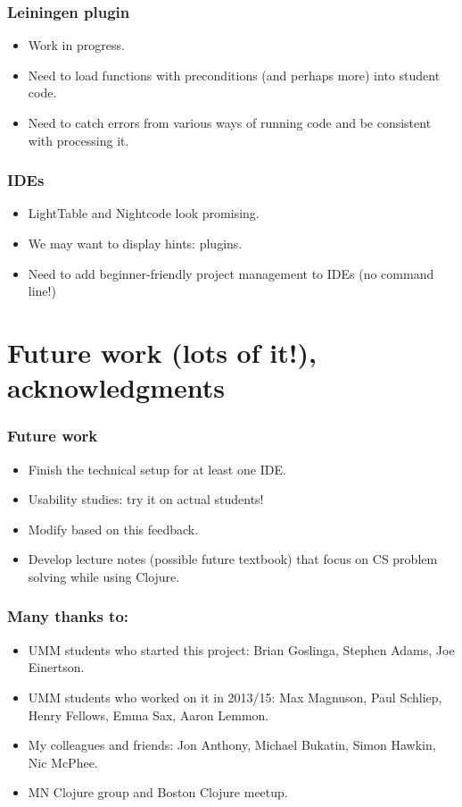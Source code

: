 \documentclass{beamer}
\begin{document}
\begin{frame}
   \frametitle{Leiningen plugin}
\begin{itemize}
\item Work in progress. 
\item Need to load functions with preconditions (and perhaps more) into student code. 
\item Need to catch errors from various ways of running code and be consistent with processing it.
\end{itemize}
\end{frame}

\begin{frame}
   \frametitle{IDEs}
\begin{itemize}
\item LightTable and Nightcode look promising.
\item We may want to display hints: plugins. 
\item Need to add beginner-friendly project management to IDEs (no command line!)
\end{itemize}
\end{frame}

\section{Future work (lots of it!), acknowledgments}

\begin{frame}
   \frametitle{Future work}
\begin{itemize}
\item Finish the technical setup for at least one IDE.
\item Usability studies: try it on actual students!
\item Modify based on this feedback. 
\item Develop lecture notes (possible future textbook) that focus on CS problem solving while using Clojure. 
\end{itemize}
\end{frame}

\begin{frame}
   \frametitle{Many thanks to:}
\begin{itemize}
\item UMM students who started this project: Brian Goslinga, Stephen Adams, Joe Einertson. 
\item UMM students who worked on it in 2013/15: Max Magnuson, Paul Schliep, Henry Fellows, Emma Sax, Aaron Lemmon. 
\item My colleagues and friends: Jon Anthony, Michael Bukatin, Simon Hawkin, Nic McPhee. 
\item MN Clojure group and Boston Clojure meetup. 
\end{itemize}
\end{frame}
\end{document}
